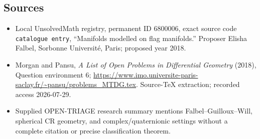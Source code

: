 \documentclass[11pt]{article}
\begin{document}
\subsection{Sources}
\begin{itemize}
\item Local UnsolvedMath registry, permanent ID \(6800006\), exact source code \texttt{catalogue entry}, ``Manifolds modelled on flag manifolds.'' Proposer Elisha Falbel, Sorbonne Université, Paris; proposed year 2018.
\item Morgan and Pansu, \emph{A List of Open Problems in Differential Geometry} (2018), Question environment 6; \url{https://www.imo.universite-paris-saclay.fr/~pansu/problems_MTDG.tex}. Source-TeX extraction; recorded access 2026-07-29.
\item Supplied OPEN-TRIAGE research summary mentions Falbel--Guilloux--Will, spherical CR geometry, and complex/quaternionic settings without a complete citation or precise classification theorem.
\end{itemize}
\end{document}
